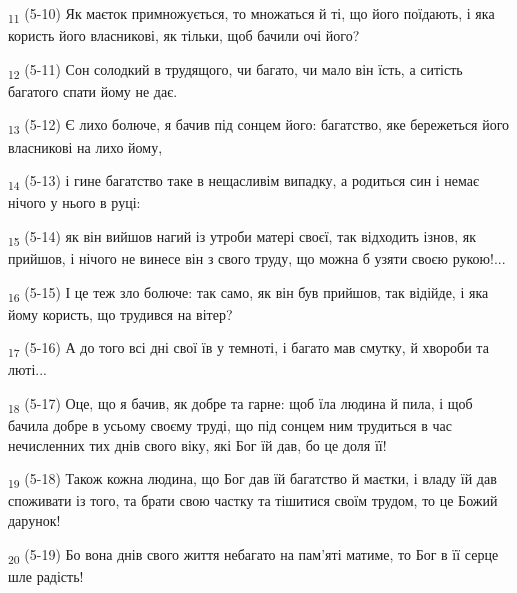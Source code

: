 \begin{tcolorbox}
\textsubscript{11} (5-10) Як маєток примножується, то множаться й ті, що його поїдають, і яка користь його власникові, як тільки, щоб бачили очі його?
\end{tcolorbox}
\begin{tcolorbox}
\textsubscript{12} (5-11) Сон солодкий в трудящого, чи багато, чи мало він їсть, а ситість багатого спати йому не дає.
\end{tcolorbox}
\begin{tcolorbox}
\textsubscript{13} (5-12) Є лихо болюче, я бачив під сонцем його: багатство, яке бережеться його власникові на лихо йому,
\end{tcolorbox}
\begin{tcolorbox}
\textsubscript{14} (5-13) і гине багатство таке в нещасливім випадку, а родиться син і немає нічого у нього в руці:
\end{tcolorbox}
\begin{tcolorbox}
\textsubscript{15} (5-14) як він вийшов нагий із утроби матері своєї, так відходить ізнов, як прийшов, і нічого не винесе він з свого труду, що можна б узяти своєю рукою!...
\end{tcolorbox}
\begin{tcolorbox}
\textsubscript{16} (5-15) І це теж зло болюче: так само, як він був прийшов, так відійде, і яка йому користь, що трудився на вітер?
\end{tcolorbox}
\begin{tcolorbox}
\textsubscript{17} (5-16) А до того всі дні свої їв у темноті, і багато мав смутку, й хвороби та люті...
\end{tcolorbox}
\begin{tcolorbox}
\textsubscript{18} (5-17) Оце, що я бачив, як добре та гарне: щоб їла людина й пила, і щоб бачила добре в усьому своєму труді, що під сонцем ним трудиться в час нечисленних тих днів свого віку, які Бог їй дав, бо це доля її!
\end{tcolorbox}
\begin{tcolorbox}
\textsubscript{19} (5-18) Також кожна людина, що Бог дав їй багатство й маєтки, і владу їй дав споживати із того, та брати свою частку та тішитися своїм трудом, то це Божий дарунок!
\end{tcolorbox}
\begin{tcolorbox}
\textsubscript{20} (5-19) Бо вона днів свого життя небагато на пам'яті матиме, то Бог в її серце шле радість!
\end{tcolorbox}
